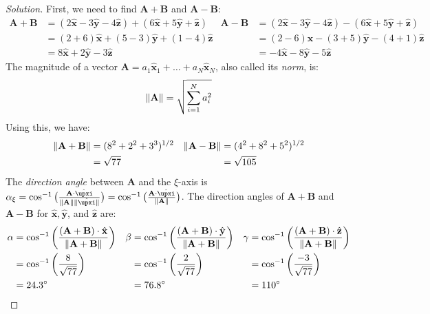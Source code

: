\documentclass[oneside]{book}
\theoremstyle{mystyle}
\DeclarePairedDelimiter\norm{\lVert}{\rVert}
\begin{document}
\begin{proof}[Solution]
First, we need to find $\mathbf{A}+\mathbf{B}$ and $\mathbf{A}-\mathbf{B}$:
\begin{align*}
    \mathbf{A}+\mathbf{B}&=(2\hat{\mathbf{x}}-3\hat{\mathbf{y}}-4\hat{\mathbf{z}})+(6\hat{\mathbf{x}}+5\hat{\mathbf{y}}+\hat{\mathbf{z}})&\mathbf{A}-\mathbf{B}&=(2\hat{\mathbf{x}}-3\hat{\mathbf{y}}-4\hat{\mathbf{z}})-(6\hat{\mathbf{x}}+5\hat{\mathbf{y}}+\hat{\mathbf{z}})\\
    &=(2+6)\hat{\mathbf{x}}+(5-3)\hat{\mathbf{y}}+(1-4)\hat{\mathbf{z}} & &=(2-6)\hat{\mathbf{x}}-(3+5)\hat{\mathbf{y}}-(4+1)\hat{\mathbf{z}}\\
    &=8\hat{\mathbf{x}}+2\hat{\mathbf{y}}-3\hat{\mathbf{z}} & &=-4\hat{\mathbf{x}}-8\hat{\mathbf{y}}-5\hat{\mathbf{z}}
\end{align*}
The magnitude of a vector $\mathbf{A} = a_{1}\hat{\mathbf{x}}_{1}+\hdots+a_{N}\hat{\mathbf{x}}_{N}$, also called its \textit{norm}, is:
\begin{equation*}
    \norm{\mathbf{A}}=\sqrt{\sum_{i=1}^{N}a_{i}^{2}}
\end{equation*}
Using this, we have:
\begin{align*}
    \norm{\mathbf{A+B}} &=(8^{2}+2^{2}+3^{3})^{1/2} &\norm{\mathbf{A-B}}&=(4^{2}+8^{2}+5^{2})^{1/2}\\
    &= \sqrt{77} & &=\sqrt{105}
\end{align*}
The \textit{direction angle} between $\mathbf{A}$ and the $\xi$-axis is $\alpha_{\xi}=\cos^{-1}\big(\frac{\mathbf{A}\cdot \hat{\boldsymbol{\upxi}}}{\norm{\mathbf{A}}\norm{\hat{\boldsymbol{\upxi}}}}\big) = \cos^{-1}\big(\frac{\mathbf{A}\cdot\hat{\boldsymbol{\upxi}}}{\norm{\mathbf{A}}}\big)$. The direction angles of $\mathbf{A}+\mathbf{B}$ and $\mathbf{A}-\mathbf{B}$ for $\hat{\mathbf{x}},\hat{\mathbf{y}}$, and $\hat{\mathbf{z}}$ are:
\begin{align*}
    \alpha &=\cos^{-1}\bigg(\frac{(\mathbf{A}+\mathbf{B})\cdot\hat{\mathbf{x}}}{\norm{\mathbf{A+B}}}\bigg) &\beta &= \cos^{-1}\bigg(\frac{(\mathbf{A}+\mathbf{B})\cdot \hat{\mathbf{y}}}{\norm{\mathbf{A}+\mathbf{B}}}\bigg) &\gamma&= \cos^{-1}\bigg(\frac{(\mathbf{A}+\mathbf{B})\cdot \hat{\mathbf{z}}}{\norm{\mathbf{A}+\mathbf{B}}}\bigg)\\
    &= \cos^{-1}\bigg(\frac{8}{\sqrt{77}}\bigg) & &= \cos^{-1}\bigg(\frac{2}{\sqrt{77}}\bigg) & &= \cos^{-1}\bigg(\frac{-3}{\sqrt{77}}\bigg)\\
    &= 24.3^{\circ} & &= 76.8^{\circ} & &= 110^{\circ}
\end{align*}

\end{proof}
\end{document}
